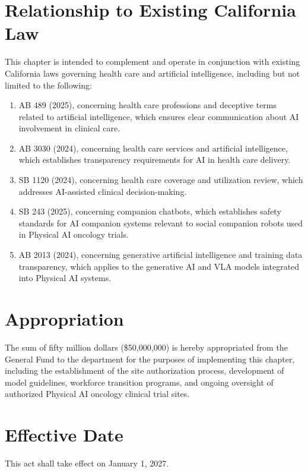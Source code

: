\documentclass[11pt,letterpaper]{article}
\begin{document}
\section{Relationship to Existing California Law}

This chapter is intended to complement and operate in conjunction with
existing California laws governing health care and artificial intelligence,
including but not limited to the following:

\begin{enumerate}[label=(\alph*)]
\item AB 489 (2025), concerning health care professions and deceptive terms
  related to artificial intelligence, which ensures clear communication about
  AI involvement in clinical care.

\item AB 3030 (2024), concerning health care services and artificial
  intelligence, which establishes transparency requirements for AI in health
  care delivery.

\item SB 1120 (2024), concerning health care coverage and utilization review,
  which addresses AI-assisted clinical decision-making.

\item SB 243 (2025), concerning companion chatbots, which establishes safety
  standards for AI companion systems relevant to social companion robots used
  in Physical AI oncology trials.

\item AB 2013 (2024), concerning generative artificial intelligence and
  training data transparency, which applies to the generative AI and VLA
  models integrated into Physical AI systems.
\end{enumerate}

\section{Appropriation}

The sum of fifty million dollars (\$50,000,000) is hereby appropriated from the
General Fund to the department for the purposes of implementing this chapter,
including the establishment of the site authorization process, development of
model guidelines, workforce transition programs, and ongoing oversight of
authorized Physical AI oncology clinical trial sites.

\section{Effective Date}

This act shall take effect on January 1, 2027.

\printbibliography[title={References}]
\end{document}
